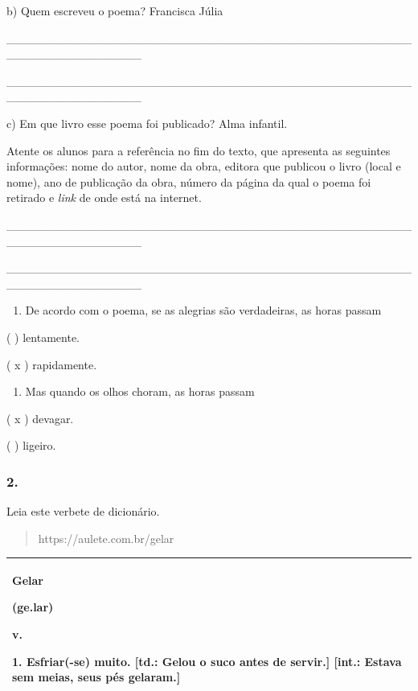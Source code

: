 b) Quem escreveu o poema? Francisca Júlia

\_\_\_\_\_\_\_\_\_\_\_\_\_\_\_\_\_\_\_\_\_\_\_\_\_\_\_\_\_\_\_\_\_\_\_\_\_\_\_\_\_\_\_\_\_\_\_\_\_\_\_\_\_\_\_\_\_\_\_\_\_\_\_\_

\_\_\_\_\_\_\_\_\_\_\_\_\_\_\_\_\_\_\_\_\_\_\_\_\_\_\_\_\_\_\_\_\_\_\_\_\_\_\_\_\_\_\_\_\_\_\_\_\_\_\_\_\_\_\_\_\_\_\_\_\_\_\_\_

c) Em que livro esse poema foi publicado? Alma infantil.

Atente os alunos para a referência no fim do texto, que apresenta as
seguintes informações: nome do autor, nome da obra, editora que publicou
o livro (local e nome), ano de publicação da obra, número da página da
qual o poema foi retirado e \emph{link} de onde está na internet.

\_\_\_\_\_\_\_\_\_\_\_\_\_\_\_\_\_\_\_\_\_\_\_\_\_\_\_\_\_\_\_\_\_\_\_\_\_\_\_\_\_\_\_\_\_\_\_\_\_\_\_\_\_\_\_\_\_\_\_\_\_\_\_\_

\_\_\_\_\_\_\_\_\_\_\_\_\_\_\_\_\_\_\_\_\_\_\_\_\_\_\_\_\_\_\_\_\_\_\_\_\_\_\_\_\_\_\_\_\_\_\_\_\_\_\_\_\_\_\_\_\_\_\_\_\_\_\_\_

\begin{enumerate}
\def\labelenumi{\alph{enumi})}
\item
  De acordo com o poema, se as alegrias são verdadeiras, as horas passam
\end{enumerate}

( ) lentamente.

( x ) rapidamente.

\begin{enumerate}
\def\labelenumi{\alph{enumi})}
\item
  Mas quando os olhos choram, as horas passam
\end{enumerate}

( x ) devagar.

( ) ligeiro.

\subsubsection{2. }\label{section-48}

Leia este verbete de dicionário.

\begin{quote}
https://aulete.com.br/gelar
\end{quote}

\begin{longtable}[]{@{}l@{}}
\toprule
\begin{minipage}[t]{0.97\columnwidth}\raggedright\strut
\textbf{Gelar}

\textbf{(ge.lar)}

\textbf{v.}

\textbf{1. Esfriar(-se) muito. {[}td.: Gelou o suco antes de servir.{]}
{[}int.: Estava sem meias, seus pés gelaram.{]}}\strut
\end{minipage}\tabularnewline
\bottomrule
\end{longtable}

